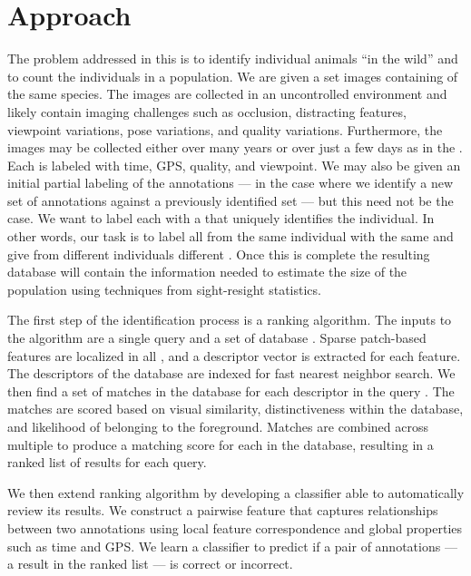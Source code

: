 \section{Approach}
    The problem addressed in this \thesis{} is to identify individual animals ``in the wild'' and to count the
      individuals in a population.
    We are given a set images containing \annots{} of the same species.
    The images are collected in an uncontrolled environment and likely contain imaging challenges such as
      occlusion, distracting features, viewpoint variations, pose variations, and quality variations.
    Furthermore, the images may be collected either over many years or over just a few days as in the \GZC{}.
    Each \annot{} is labeled with time, GPS, quality, and viewpoint.
    We may also be given an initial partial \name{} labeling of the annotations --- \eg{} in the case where we
      identify a new set of annotations against a previously identified set --- but this need not be the case.
    We want to label each \annot{} with a \glossterm{\name{}} that uniquely identifies the individual.
    In other words, our task is to label all \annots{} from the same individual with the same \name{} and give
      \annots{} from different individuals different \names{}.
    Once this is complete the resulting database will contain the information needed to estimate the size of the
      population using techniques from sight-resight statistics.

    The first step of the identification process is a ranking algorithm. The inputs to the algorithm are a single query
    \annot{} and a set of database \annots{}. Sparse patch-based features are localized in all \annots{}, and a
    descriptor vector is extracted for each feature. The descriptors of the database \annots{} are indexed for fast
    nearest neighbor search. We then find a set of matches in the database for each descriptor in the query \annot{}.
    The matches are scored based on visual similarity, distinctiveness within the database, and likelihood of belonging
    to the foreground. Matches are combined across multiple \exemplar{} \annots{} to produce a matching score for each
    \name{} in the database, resulting in a ranked list of results for each query.

    We then extend ranking algorithm by developing a classifier able to automatically review its results. We construct a
    pairwise feature that captures relationships between two annotations using local feature correspondence and global
    properties such as time and GPS. We learn a classifier to predict if a pair of annotations --- \ie{} a result in the
    ranked list --- is correct or incorrect.

